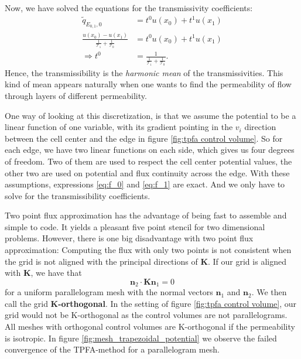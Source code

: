 \documentclass[../Main/main.tex]{subfiles}
\begin{document}
	Now, we have solved the equations for the transmissivity coefficients:
	\begin{equation}\label{eq:harmonic mean}
		\begin{aligned}
			\tilde{q}_{E_{0,1},0} &= t^0 u(x_0) + t^1 u(x_1) \\
			\frac{u(x_0)-u(x_1)}{\frac{1}{\mathcal{T}_1} + \frac{1}{\mathcal{T}_0}} &= t^0 u(x_0) + t^1 u(x_1) \\
			\Rightarrow t^0 &= \frac{1}{\frac{1}{\mathcal{T}_1} + \frac{1}{\mathcal{T}_0}}.
		\end{aligned}
	\end{equation} 
	Hence, the transmissibility is the \emph{harmonic mean} of the transmissivities. This kind of mean appears naturally when one wants to find the permeability of flow through layers of different permeability.
	\par
	  One way of looking at this discretization, is that we assume the potential to be a linear function of one variable, with its gradient pointing in the $v_i$ direction between the cell center and the edge in figure \ref{fig:tpfa control volume}. So for each edge, we have two linear functions on each side, which gives us four degrees of freedom. Two of them are used to respect the cell center potential values, the other two are used on potential and flux continuity across the edge. With these assumptions, expressions \eqref{eq:f_0} and \eqref{eq:f_1} are exact. And we only have to solve for the transmissibility coefficients.\par
	 Two point flux approximation has the advantage of being fast to assemble and simple to code. It yields a pleasant five point stencil for two dimensional problems. However, there is one big disadvantage with two point flux approximation: Computing the flux with only two points is not consistent when the grid is not aligned with the principal directions of $\bm{K}$. If our grid is aligned with $\bm{K}$, we have that 
	\begin{equation}
		\bm{n}_2 \cdot \bm{K}\bm{n}_1 = 0
	\end{equation}
	for a uniform parallelogram mesh with the normal vectors $\bm{n}_1$ and $\bm{n}_2$. We then call the grid \textbf{K-orthogonal}. 
	 In the setting of figure \ref{fig:tpfa control volume}, our grid would not be K-orthogonal as the control volumes are not parallelograms. All meshes with orthogonal control volumes are K-orthogonal if the permeability is isotropic. In figure \ref{fig:mesh_trapezoidal_potential} we observe the failed convergence of the TPFA-method for a parallelogram mesh.
\end{document}
